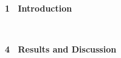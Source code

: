 \documentclass[portrait,a0,posterdraft]{a0poster} %
\def\exMinipage{782mm}
\def\exHalfMinipage{380mm}
\def\exSubHalfMinipage{369mm}
\begin{document}
{{{\begin{minipage}[t]{\exMinipage}
\begin{minipage}[t]{\exHalfMinipage}
\begin{minipage}[t]{\exHalfMinipage}%
\LARGE{\white \bf1 \ Introduction}\\[-10pt]
\begin{minipage}[t]{\exSubHalfMinipage}
\begin{mdframed}[style=smallframe]
\introtext
\end{mdframed}
\end{minipage}
\end{minipage}%
\\[40pt]
\begin{minipage}[t]{\exHalfMinipage}%
\LARGE{\white  \bf 4 \ Results and Discussion}\\[-10pt]
\begin{minipage}[t]{\exSubHalfMinipage}
\begin{mdframed}[style=smallframe]
\resultstext
\end{mdframed}
\end{minipage}
\end{minipage}%
\\[40pt]
\end{minipage}%
\hspace{0.2cm}
\begin{minipage}[t]{\exHalfMinipage}


\end{minipage}
\end{minipage}}}}
\end{document}
